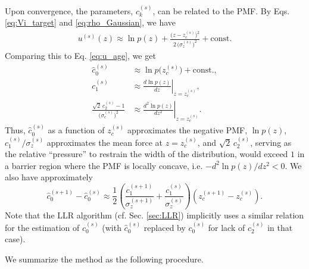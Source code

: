 \documentclass[preprint, superscriptaddress, floatfix]{revtex4-1}
\begin{document}
Upon convergence,
the parameters, $c_k^{(s)}$,
can be related to the PMF.
By Eqs. \eqref{eq:Vi_target} and \eqref{eq:rho_Gaussian}, we have
\begin{align*}
  u^{(s)}(z)
  \approx
  \ln p(z)
  +
  \frac{ \bigl(z - z_c^{(s)} \bigr)^2 }
  { 2 \, \bigl( \sigma_z^{(s)} \bigr)^2 }
  +
  \mathrm{const.}
\end{align*}
%
Comparing this to Eq. \eqref{eq:u_age}, we get
\begin{subequations}
\begin{align}
  \hat c_0^{(s)}
  &\approx \ln p\bigl(z_c^{(s)}\bigr) + \mathrm{const.}
  ,
  \\
  c_1^{(s)}
  &\approx \left. \frac{d \ln p(z) } { d z } \right|_{z = z_c^{(s)}}
  ,
  \\
  \frac{
    \sqrt 2 \, c_2^{(s)} - 1
  } { \bigl( \sigma_c^{(s)} \bigr)^2 }
  &\approx \left. \frac{d^2 \ln p(z) } { d z^2 } \right|_{z = z_c^{(s)}}
  .
\end{align}
\label{eq:ck_limit}
\end{subequations}
%
Thus,
$\hat c_0^{(s)}$ as a function of $z_c^{(s)}$
approximates the negative PMF, $\ln p(z)$,\cite{maragliano2006, *abrams2008}
%
$c_1^{(s)}/\sigma_z^{(s)}$
approximates the mean force at $z = z_c^{(s)}$,
%
and $\sqrt{2} \, c_2^{(s)}$,
serving as the relative ``pressure''
to restrain the width of the distribution,
would exceed $1$ in a barrier region
where the PMF is locally concave,
i.e. $-d^2\ln p(z)/dz^2 < 0$.
%
%
We also have approximately\cite{park2007, *nguyen2013, *zhang2015st}
%
\begin{equation}
  \hat c_0^{(s+1)} - \hat c_0^{(s)}
  \approx
  \frac{1}{2}\left(
    \frac{ c_1^{(s+1)} } { \sigma_z^{(s+1)} }
    +
    \frac{ c_1^{(s)} } { \sigma_z^{(s)} }
  \right)
  \left(
  z_c^{(s+1)} - z_c^{(s)}
  \right)
  .
  \label{eq:c0_est}
\end{equation}
%
Note that the LLR algorithm (cf. Sec. \ref{sec:LLR}) implicitly uses
a similar relation for the estimation of $c_0^{(s)}$
(with $\hat c_0^{(s)}$ replaced by $c_0^{(s)}$
for lack of $c_2^{(s)}$ in that case).

We summarize the method as the following procedure.
\end{document}
